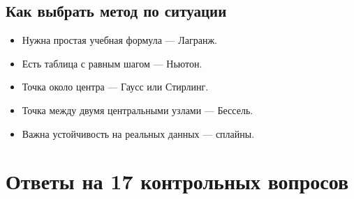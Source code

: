 \documentclass[12pt,a4paper]{article}
\begin{document}
\subsection{Как выбрать метод по ситуации}
\begin{itemize}
\item Нужна простая учебная формула --- Лагранж.
\item Есть таблица с равным шагом --- Ньютон.
\item Точка около центра --- Гаусс или Стирлинг.
\item Точка между двумя центральными узлами --- Бессель.
\item Важна устойчивость на реальных данных --- сплайны.
\end{itemize}

\section{Ответы на 17 контрольных вопросов}
\end{document}
